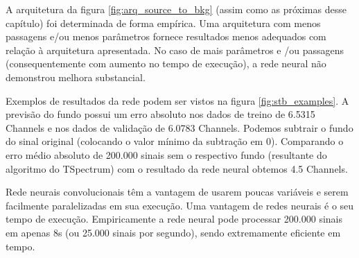 \documentclass[a4paper,12pt,oneside]{book}
\begin{document}

\par A arquitetura da figura \ref{fig:arq_source_to_bkg} (assim como as próximas desse capítulo) foi determinada de forma empírica. Uma arquitetura com menos passagens e/ou menos parâmetros fornece resultados menos adequados com relação à arquitetura apresentada. No caso de mais parâmetros e /ou passagens (consequentemente com aumento no tempo de execução), a rede neural não demonstrou melhora substancial.

\par Exemplos de resultados da rede podem ser vistos na figura \ref{fig:stb_examples}. A previsão do fundo possui um erro absoluto nos dados de treino de 6.5315 Channels e nos dados de validação de 6.0783 Channels. Podemos subtrair o fundo do sinal original (colocando o valor mínimo da subtração em 0). Comparando o erro médio absoluto de 200.000 sinais sem o respectivo fundo (resultante do algoritmo do TSpectrum) com o resultado da rede neural obtemos 4.5 Channels.

\par Rede neurais convolucionais têm a vantagem de usarem poucas variáveis e serem facilmente paralelizadas em sua execução. Uma vantagem de redes neurais é o seu tempo de execução. Empiricamente a rede neural pode processar 200.000 sinais em apenas 8s (ou 25.000 sinais por segundo), sendo extremamente eficiente em tempo.
\end{document}
